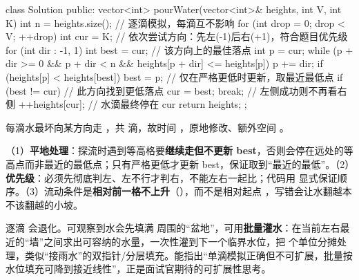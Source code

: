 \begin{cpp}
class Solution {
public:
    vector<int> pourWater(vector<int>& heights, int V, int K) {
        int n = heights.size();
        // 逐滴模拟，每滴互不影响
        for (int drop = 0; drop < V; ++drop) {
            int cur = K;
            // 依次尝试方向：先左(-1)后右(+1)，符合题目优先级
            for (int dir : {-1, 1}) {
                int best = cur;                 // 该方向上的最佳落点
                int p = cur;
                while (p + dir >= 0 && p + dir < n &&
                       heights[p + dir] <= heights[p]) {
                    p += dir;
                    if (heights[p] < heights[best])
                        best = p;               // 仅在严格更低时更新，取最近最低点
                }
                if (best != cur) {              // 此方向找到更低落点
                    cur = best;
                    break;                       // 左侧成功则不再看右侧
                }
            }
            ++heights[cur];                      // 水滴最终停在 cur
        }
        return heights;
    }
};
\end{cpp}

\begin{keypoint}[复杂度]
每滴水最坏向某方向走 ，共  滴，故时间 ，原地修改、额外空间 。
\end{keypoint}

\begin{pitfall}
（1）\textbf{平地处理}：探流时遇到等高格要\textbf{继续走但不更新 best}，否则会停在远处的等高点而非最近的最低点；只有严格更低才更新 best，保证取到“最近的最低”。（2）\textbf{优先级}：必须先彻底判左、左不行才判右，不能左右一起比；代码用  显式保证顺序。（3）流动条件是\textbf{相对前一格不上升}（），而不是相对起点 ，写错会让水翻越本不该翻越的小坡。
\end{pitfall}

\begin{followup}
逐滴  会退化。可观察到水会先填满  周围的“盆地”，可用\textbf{批量灌水}：在当前左右最近的“墙”之间求出可容纳的水量，一次性灌到下一个临界水位，把  个单位分摊处理，类似“接雨水”的双指针/分层填充。能指出“单滴模拟正确但不可扩展，批量按水位填充可降到接近线性”，正是面试官期待的可扩展性思考。
\end{followup}


